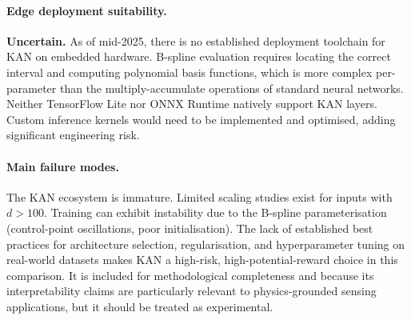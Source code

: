 \paragraph{Edge deployment suitability.}
\textbf{Uncertain.}  As of mid-2025, there is no established deployment
toolchain for KAN on embedded hardware.  B-spline evaluation requires
locating the correct interval and computing polynomial basis functions,
which is more complex per-parameter than the multiply-accumulate
operations of standard neural networks.  Neither TensorFlow Lite nor
ONNX Runtime natively support KAN layers.  Custom inference kernels
would need to be implemented and optimised, adding significant
engineering risk.

\paragraph{Main failure modes.}
The KAN ecosystem is immature.  Limited scaling studies exist for
inputs with $d > 100$.  Training can exhibit instability due to the
B-spline parameterisation (control-point oscillations, poor
initialisation).  The lack of established best practices for
architecture selection, regularisation, and hyperparameter tuning on
real-world datasets makes KAN a high-risk, high-potential-reward choice
in this comparison.  It is included for methodological completeness
and because its interpretability claims are particularly relevant to
physics-grounded sensing applications, but it should be treated as
experimental.


